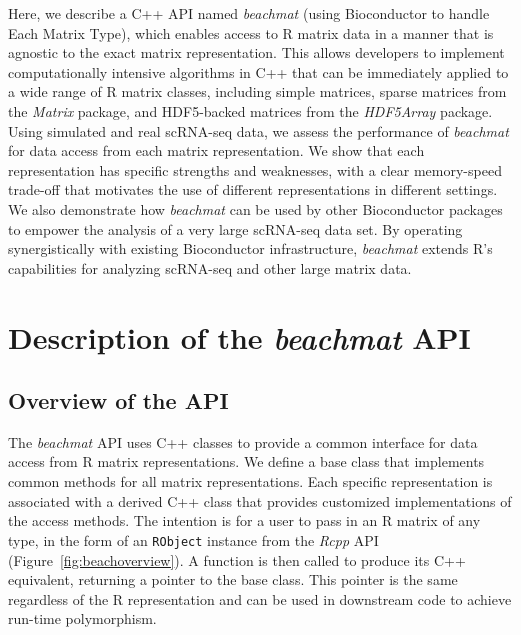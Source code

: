 \documentclass[10pt,letterpaper]{article}
\newcommand{\beachmat}{\textit{beachmat}}
\newcommand{\code}[1]{\texttt{#1}}
\begin{document}

Here, we describe a C++ API named \beachmat{} (using Bioconductor to handle Each Matrix Type), which enables access to R matrix data in a manner that is agnostic to the exact matrix representation.
This allows developers to implement computationally intensive algorithms in C++ that can be immediately applied to a wide range of R matrix classes, including simple matrices, sparse matrices from the \textit{Matrix} package, and HDF5-backed matrices from the \textit{HDF5Array} package.
Using simulated and real scRNA-seq data, we assess the performance of \beachmat{} for data access from each matrix representation.
We show that each representation has specific strengths and weaknesses, with a clear memory-speed trade-off that motivates the use of different representations in different settings.
We also demonstrate how \beachmat{} can be used by other Bioconductor packages to empower the analysis of a very large scRNA-seq data set. 
By operating synergistically with existing Bioconductor infrastructure, \beachmat{} extends R's capabilities for analyzing scRNA-seq and other large matrix data.

\section*{Description of the \beachmat{} API}

\subsection*{Overview of the API}
The \beachmat{} API uses C++ classes to provide a common interface for data access from R matrix representations.
We define a base class that implements common methods for all matrix representations.
Each specific representation is associated with a derived C++ class that provides customized implementations of the access methods.
The intention is for a user to pass in an R matrix of any type, in the form of an \code{RObject} instance from the \textit{Rcpp} API (Figure~\ref{fig:beachoverview}).
A function is then called to produce its C++ equivalent, returning a pointer to the base class.
This pointer is the same regardless of the R representation and can be used in downstream code to achieve run-time polymorphism.
\end{document}
